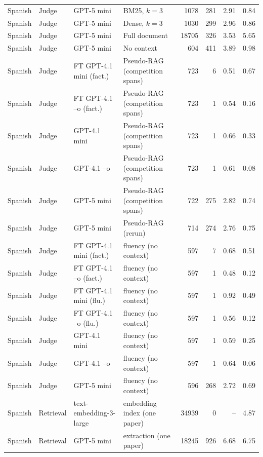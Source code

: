 \begin{tabular}{llllrrrr}
\hline
Spanish & Judge & GPT-5 mini & BM25, $k=3$ & 1078 & 281 & 2.91 & 0.84 \\
Spanish & Judge & GPT-5 mini & Dense, $k=3$ & 1030 & 299 & 2.96 & 0.86 \\
Spanish & Judge & GPT-5 mini & Full document & 18705 & 326 & 3.53 & 5.65 \\
Spanish & Judge & GPT-5 mini & No context & 604 & 411 & 3.89 & 0.98 \\
Spanish & Judge & FT GPT-4.1 mini (fact.) & Pseudo-RAG (competition spans) & 723 & 6 & 0.51 & 0.67 \\
Spanish & Judge & FT GPT-4.1 --o (fact.) & Pseudo-RAG (competition spans) & 723 & 1 & 0.54 & 0.16 \\
Spanish & Judge & GPT-4.1 mini & Pseudo-RAG (competition spans) & 723 & 1 & 0.66 & 0.33 \\
Spanish & Judge & GPT-4.1 --o & Pseudo-RAG (competition spans) & 723 & 1 & 0.61 & 0.08 \\
Spanish & Judge & GPT-5 mini & Pseudo-RAG (competition spans) & 722 & 275 & 2.82 & 0.74 \\
Spanish & Judge & GPT-5 mini & Pseudo-RAG (rerun) & 714 & 274 & 2.76 & 0.75 \\
Spanish & Judge & FT GPT-4.1 mini (fact.) & fluency (no context) & 597 & 7 & 0.68 & 0.51 \\
Spanish & Judge & FT GPT-4.1 --o (fact.) & fluency (no context) & 597 & 1 & 0.48 & 0.12 \\
Spanish & Judge & FT GPT-4.1 mini (flu.) & fluency (no context) & 597 & 1 & 0.92 & 0.49 \\
Spanish & Judge & FT GPT-4.1 --o (flu.) & fluency (no context) & 597 & 1 & 0.56 & 0.12 \\
Spanish & Judge & GPT-4.1 mini & fluency (no context) & 597 & 1 & 0.59 & 0.25 \\
Spanish & Judge & GPT-4.1 --o & fluency (no context) & 597 & 1 & 0.64 & 0.06 \\
Spanish & Judge & GPT-5 mini & fluency (no context) & 596 & 268 & 2.72 & 0.69 \\
Spanish & Retrieval & text-embedding-3-large & embedding index (one paper) & 34939 & 0 & -- & 4.87 \\
Spanish & Retrieval & GPT-5 mini & extraction (one paper) & 18245 & 926 & 6.68 & 6.75 \\
\hline
\end{tabular}
